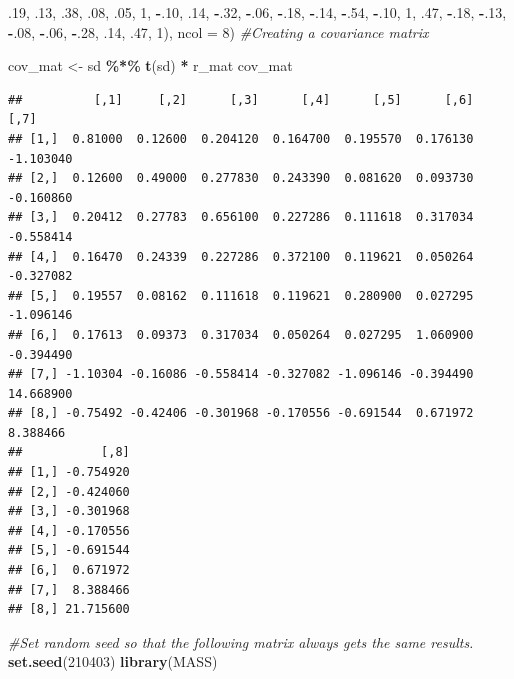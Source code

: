 \documentclass[
  11pt,
]{book}
\newenvironment{Shaded}{\begin{snugshade}}{\end{snugshade}}
\newcommand{\AttributeTok}[1]{\textcolor[rgb]{0.27,0.27,0.27}{#1}}
\newcommand{\CommentTok}[1]{\textcolor[rgb]{0.37,0.37,0.37}{\textit{#1}}}
\newcommand{\DecValTok}[1]{\textcolor[rgb]{0.06,0.06,0.06}{#1}}
\newcommand{\FunctionTok}[1]{\textcolor[rgb]{0.27,0.27,0.27}{\textbf{#1}}}
\newcommand{\NormalTok}[1]{#1}
\newcommand{\OtherTok}[1]{\textcolor[rgb]{0.37,0.37,0.37}{#1}}
\newcommand{\SpecialCharTok}[1]{\textcolor[rgb]{0.43,0.43,0.43}{\textbf{#1}}}
\begin{document}
\begin{Shaded}
\begin{Highlighting}[]
\NormalTok{        .}\DecValTok{19}\NormalTok{, .}\DecValTok{13}\NormalTok{, .}\DecValTok{38}\NormalTok{, .}\DecValTok{08}\NormalTok{, .}\DecValTok{05}\NormalTok{, }\DecValTok{1}\NormalTok{, }\SpecialCharTok{{-}}\NormalTok{.}\DecValTok{10}\NormalTok{, .}\DecValTok{14}\NormalTok{, }
        \SpecialCharTok{{-}}\NormalTok{.}\DecValTok{32}\NormalTok{, }\SpecialCharTok{{-}}\NormalTok{.}\DecValTok{06}\NormalTok{, }\SpecialCharTok{{-}}\NormalTok{.}\DecValTok{18}\NormalTok{, }\SpecialCharTok{{-}}\NormalTok{.}\DecValTok{14}\NormalTok{, }\SpecialCharTok{{-}}\NormalTok{.}\DecValTok{54}\NormalTok{, }\SpecialCharTok{{-}}\NormalTok{.}\DecValTok{10}\NormalTok{, }\DecValTok{1}\NormalTok{, .}\DecValTok{47}\NormalTok{,}
        \SpecialCharTok{{-}}\NormalTok{.}\DecValTok{18}\NormalTok{, }\SpecialCharTok{{-}}\NormalTok{.}\DecValTok{13}\NormalTok{, }\SpecialCharTok{{-}}\NormalTok{.}\DecValTok{08}\NormalTok{, }\SpecialCharTok{{-}}\NormalTok{.}\DecValTok{06}\NormalTok{, }\SpecialCharTok{{-}}\NormalTok{.}\DecValTok{28}\NormalTok{, .}\DecValTok{14}\NormalTok{, .}\DecValTok{47}\NormalTok{, }\DecValTok{1}\NormalTok{), }\AttributeTok{ncol =} \DecValTok{8}\NormalTok{)}
\CommentTok{\#Creating a covariance matrix}

\NormalTok{cov\_mat }\OtherTok{\textless{}{-}}\NormalTok{ sd }\SpecialCharTok{\%*\%} \FunctionTok{t}\NormalTok{(sd) }\SpecialCharTok{*}\NormalTok{ r\_mat}
\NormalTok{cov\_mat}
\end{Highlighting}
\end{Shaded}

\begin{verbatim}
##          [,1]     [,2]      [,3]      [,4]      [,5]      [,6]      [,7]
## [1,]  0.81000  0.12600  0.204120  0.164700  0.195570  0.176130 -1.103040
## [2,]  0.12600  0.49000  0.277830  0.243390  0.081620  0.093730 -0.160860
## [3,]  0.20412  0.27783  0.656100  0.227286  0.111618  0.317034 -0.558414
## [4,]  0.16470  0.24339  0.227286  0.372100  0.119621  0.050264 -0.327082
## [5,]  0.19557  0.08162  0.111618  0.119621  0.280900  0.027295 -1.096146
## [6,]  0.17613  0.09373  0.317034  0.050264  0.027295  1.060900 -0.394490
## [7,] -1.10304 -0.16086 -0.558414 -0.327082 -1.096146 -0.394490 14.668900
## [8,] -0.75492 -0.42406 -0.301968 -0.170556 -0.691544  0.671972  8.388466
##           [,8]
## [1,] -0.754920
## [2,] -0.424060
## [3,] -0.301968
## [4,] -0.170556
## [5,] -0.691544
## [6,]  0.671972
## [7,]  8.388466
## [8,] 21.715600
\end{verbatim}

\begin{Shaded}
\begin{Highlighting}[]
\CommentTok{\#Set random seed so that the following matrix always gets the same results.}
\FunctionTok{set.seed}\NormalTok{(}\DecValTok{210403}\NormalTok{)}
\FunctionTok{library}\NormalTok{(MASS)}
\end{Highlighting}
\end{Shaded}
\end{document}
